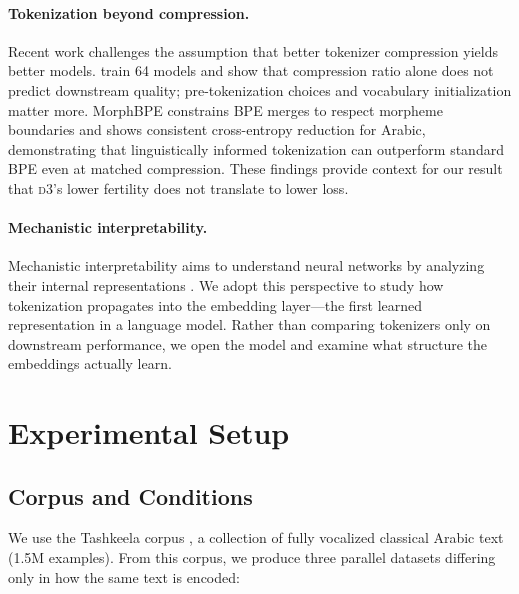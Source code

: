 \documentclass[11pt]{article}
\newcommand{\dThree}{\textsc{d3}}
\begin{document}
\paragraph{Tokenization beyond compression.}
Recent work challenges the assumption that better tokenizer compression yields better models.
\citet{schmidt2024tokenization} train 64 models and show that compression ratio alone does not predict downstream quality; pre-tokenization choices and vocabulary initialization matter more.
MorphBPE \cite{asgari2025morphbpe} constrains BPE merges to respect morpheme boundaries and shows consistent cross-entropy reduction for Arabic, demonstrating that linguistically informed tokenization can outperform standard BPE even at matched compression.
These findings provide context for our result that \dThree{}'s lower fertility does not translate to lower loss.

\paragraph{Mechanistic interpretability.}
Mechanistic interpretability aims to understand neural networks by analyzing their internal representations \cite{elhage2022toy, olsson2022incontext}.
We adopt this perspective to study how tokenization propagates into the embedding layer---the first learned representation in a language model.
Rather than comparing tokenizers only on downstream performance, we open the model and examine what structure the embeddings actually learn.


\section{Experimental Setup}
\label{sec:setup}

\subsection{Corpus and Conditions}

We use the Tashkeela corpus \cite{zerrouki2017tashkeela}, a collection of fully vocalized classical Arabic text (1.5M examples).
From this corpus, we produce three parallel datasets differing only in how the same text is encoded:
\end{document}
